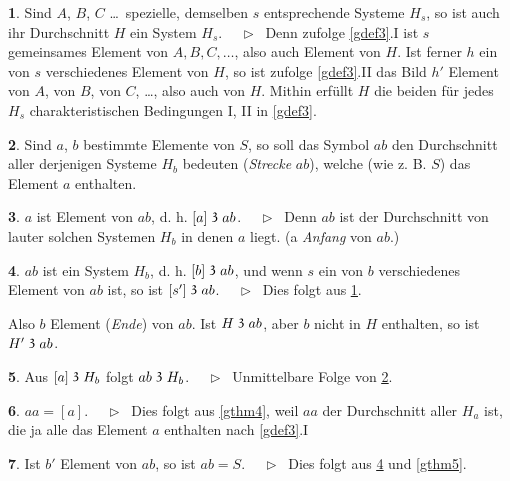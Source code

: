 \documentclass[leqno,hidelinks,10pt]{article}
\theoremstyle{definition}
\newtheorem{satz}{\protect\satzname}
\newtheorem{deff}[satz]{\protect\deffname}
\newcommand{\satzname}{}
\newcommand{\deffname}{}
\renewcommand{\satzname}{\hspace{-4pt}.\ Satz}%
\renewcommand{\deffname}{\hspace{-4pt}.\ Definition}%
\renewcommand{\satzname}{\hspace{-4pt}.\ Theorem}%
\renewcommand{\deffname}{\hspace{-4pt}.\ Definition}%
\newcommand\Beweis{\medskip \newline $ \phantom{'.'} \rhd \ $}%
\newcommand\TeilVon{\mathrel{\raisebox{0.45ex}{$\mathfrak{3}$}}}
\newcommand{\sref}[1]{\underline{\ref{#1}}}%
\begin{document}
\begin{paracol}{2}
\begin{leftcolumn}
\begin{satz}\label{gthm8}
Sind $A$, $B$, $C$ \ldots\ spezielle, demselben $s$ entsprechende Systeme $H_s$,
so ist auch ihr Durchschnitt $H$ ein System $H_s$.
\Beweis
Denn zufolge \sref{gdef3}.I ist $s$ gemeinsames Element von
$A, B, C, \ldots$, also auch Element von $H$. Ist ferner $h$ ein von $s$
verschiedenes Element von $H$, so ist zufolge \sref{gdef3}.II das
Bild $h'$ Element von $A$, von $B$, von $C$, \ldots, also auch von $H$. Mithin
erfüllt $H$ die beiden für jedes $H_s$ charakteristischen Bedingungen I, II
in \sref{gdef3}.
\end{satz}

\begin{deff}\label{gdef9}
Sind $a$, $b$ bestimmte Elemente von $S$, so soll das Symbol $ab$ den Durchschnitt
aller derjenigen Systeme $H_b$ bedeuten (\emph{Strecke} $ab$), welche (wie z. B. $S$)
das Element $a$ enthalten.
\end{deff}

\newpage

\begin{satz}\label{gthm10}
$a$ ist Element von $ab$, d. h. $[a] \TeilVon ab$.
\Beweis
Denn $ab$ ist der Durchschnitt von lauter solchen Systemen $H_b$ in denen $a$
liegt. (a \emph{Anfang} von $ab$.)
\end{satz}

\begin{satz}\label{gthm11}
$ab$ ist ein System $H_b$, d. h. $[b] \TeilVon ab$, und wenn $s$ ein von $b$
verschiedenes Element von $ab$ ist, so ist $[s'] \TeilVon ab$.
\Beweis
Dies folgt aus \sref{gthm8}.
\end{satz}

Also $b$ Element (\emph{Ende}) von $ab$. Ist $H \TeilVon ab$, aber $b$ nicht in
$H$ enthalten, so ist $H' \TeilVon ab$.

\begin{satz}\label{gthm12}
Aus $[a] \TeilVon H_b$ folgt $ab \TeilVon H_b$.
\Beweis
Unmittelbare Folge von \sref{gdef9}.
\end{satz}

\begin{satz}\label{gthm13}
$aa = [a]$.
\Beweis
Dies folgt aus \sref{gthm4}, weil $aa$ der Durchschnitt aller $H_a$  ist, die
ja alle das Element $a$ enthalten nach \sref{gdef3}.I
\end{satz}

\begin{satz}\label{gthm14}
Ist $b'$ Element von $ab$, so ist $ab = S$.
\Beweis
Dies folgt aus \sref{gthm11} und \sref{gthm5}.
\end{satz}


\end{leftcolumn}
\end{paracol}
\end{document}
